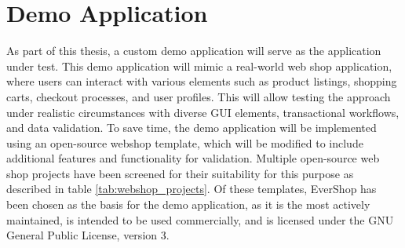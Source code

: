 \section{Demo Application}

As part of this thesis, a custom demo application will serve as the application under test.
This demo application will mimic a real-world web shop application, where users can interact with various elements such as product listings, shopping carts, checkout processes, and user profiles.
This will allow testing the approach under realistic circumstances with diverse GUI elements, transactional workflows, and data validation.
To save time, the demo application will be implemented using an open-source webshop template, which will be modified to include additional features and functionality for validation.
Multiple open-source web shop projects have been screened for their suitability for this purpose as described in table \ref{tab:webshop_projects}.
Of these templates, EverShop has been chosen as the basis for the demo application, as it is the most actively maintained, is intended to be used commercially, and is licensed under the GNU General Public License, version 3.

